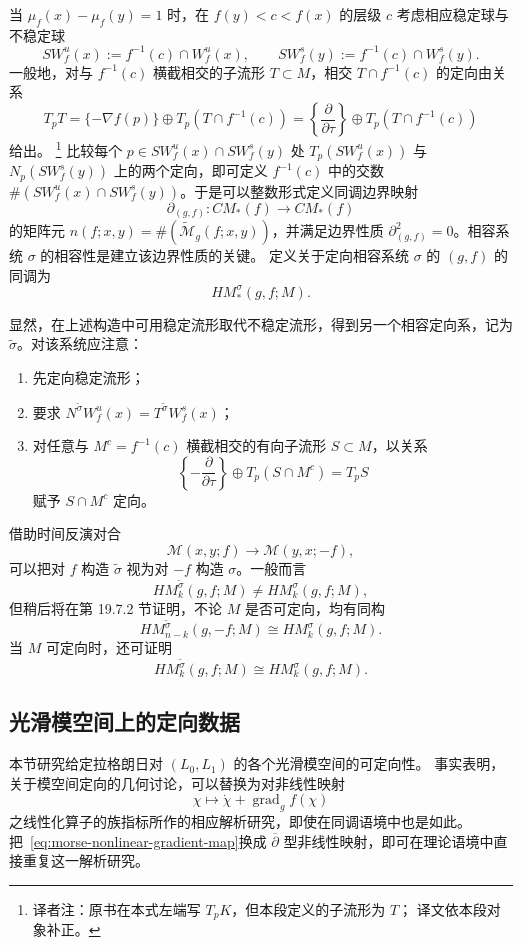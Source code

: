 当 $\mu_f(x)-\mu_f(y)=1$ 时，在 $f(y)<c<f(x)$ 的层级 $c$ 考虑相应稳定球与不稳定球
\[
 S W_f^u(x):=f^{-1}(c)\cap W_f^u(x),
 \qquad
 S W_f^s(y):=f^{-1}(c)\cap W_f^s(y).
\]
一般地，对与 $f^{-1}(c)$ 横截相交的子流形 $T\subset M$，相交
$T\cap f^{-1}(c)$ 的定向由关系
\begin{equation}
 T_pT=\{-\nabla f(p)\}\oplus T_p(T\cap f^{-1}(c))
 =\left\{\frac\partial{\partial\tau}\right\}
 \oplus T_p(T\cap f^{-1}(c))
 \label{eq:morse-level-intersection-orientation}
\end{equation}
给出。
\footnote{译者注：原书在本式左端写 $T_pK$，但本段定义的子流形为 $T$；
译文依本段对象补正。}
比较每个 $p\in S W_f^u(x)\cap S W_f^s(y)$ 处
$T_p(S W_f^u(x))$ 与 $N_p(S W_f^s(y))$ 上的两个定向，即可定义
$f^{-1}(c)$ 中的交数
$\#(S W_f^u(x)\cap S W_f^s(y))$。于是可以整数形式定义\personMorse{}同调边界映射
\[
 \partial_{(g,f)}:CM_*(f)\longrightarrow CM_*(f)
\]
的矩阵元
$n(f;x,y)=\#(\widetilde{\mathcal M}_g(f;x,y))$，并满足边界性质
$\partial_{(g,f)}^2=0$。相容系统 $\sigma$ 的相容性是建立该边界性质的关键。
定义关于定向相容系统 $\sigma$ 的 $(g,f)$ 的\personMorse{}同调为
\[
 HM_*^\sigma(g,f;M).
\]

显然，在上述构造中可用稳定流形取代不稳定流形，得到另一个相容定向系，记为
$\widetilde\sigma$。对该系统应注意：
\begin{enumerate}[label=(\arabic*)]
\item 先定向稳定流形；
\item 要求 $N^{\widetilde\sigma}W_f^u(x)=T^{\widetilde\sigma}W_f^s(x)$；
\item 对任意与 $M^c=f^{-1}(c)$ 横截相交的有向子流形 $S\subset M$，以关系
\[
 \left\{-\frac\partial{\partial\tau}\right\}
 \oplus T_p(S\cap M^c)=T_pS
\]
赋予 $S\cap M^c$ 定向。
\end{enumerate}
借助时间反演对合
\[
 \mathcal M(x,y;f)\longrightarrow\mathcal M(y,x;-f),
\]
可以把对 $f$ 构造 $\widetilde\sigma$ 视为对 $-f$ 构造 $\sigma$。一般而言
\[
 HM_k^{\widetilde\sigma}(g,f;M)\neq HM_k^\sigma(g,f;M),
\]
但稍后将在第 19.7.2 节证明，不论 $M$ 是否可定向，均有同构
\[
 HM_{n-k}^{\widetilde\sigma}(g,-f;M)\cong HM_k^\sigma(g,f;M).
\]
当 $M$ 可定向时，还可证明
\[
 HM_k^{\widetilde\sigma}(g,f;M)\cong HM_k^\sigma(g,f;M).
\]

\subsection{光滑\personFloer{}模空间上的定向数据}
\label{subsec:orientation-data-smooth-floer-moduli}

本节研究给定拉格朗日对 $(L_0,L_1)$ 的各个光滑\personFloer{}模空间的可定向性。
事实表明，关于\personMorse{}模空间定向的几何讨论，可以替换为对非线性映射
\begin{equation}
 \chi\longmapsto\dot\chi+\operatorname{grad}_gf(\chi)
 \label{eq:morse-nonlinear-gradient-map}
\end{equation}
之线性化\personFredholm{}算子的族指标所作的相应解析研究，即使在\personMorse{}同调语境中也是如此。
把~\eqref{eq:morse-nonlinear-gradient-map}换成 $\overline\partial$ 型非线性映射，即可在\personFloer{}理论语境中直接重复这一解析研究。


